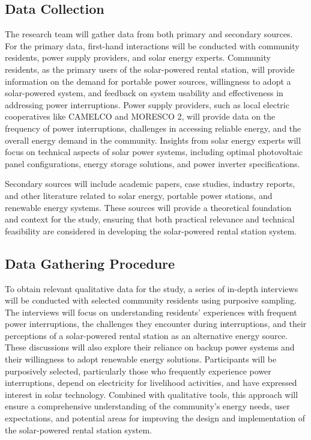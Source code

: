 {\subsection{Data Collection}

The research team will gather data from both primary and secondary sources. For the primary data, first-hand interactions will be conducted with community residents, power supply providers, and solar energy experts. Community residents, as the primary users of the solar-powered rental station, will provide information on the demand for portable power sources, willingness to adopt a solar-powered system, and feedback on system usability and effectiveness in addressing power interruptions. Power supply providers, such as local electric cooperatives like CAMELCO and MORESCO 2, will provide data on the frequency of power interruptions, challenges in accessing reliable energy, and the overall energy demand in the community. Insights from solar energy experts will focus on technical aspects of solar power systems, including optimal photovoltaic panel configurations, energy storage solutions, and power inverter specifications.

Secondary sources will include academic papers, case studies, industry reports, and other literature related to solar energy, portable power stations, and renewable energy systems. These sources will provide a theoretical foundation and context for the study, ensuring that both practical relevance and technical feasibility are considered in developing the solar-powered rental station system.

\subsection{Data Gathering Procedure}

To obtain relevant qualitative data for the study, a series of in-depth interviews will be conducted with selected community residents using purposive sampling. The interviews will focus on understanding residents’ experiences with frequent power interruptions, the challenges they encounter during interruptions, and their perceptions of a solar-powered rental station as an alternative energy source. These discussions will also explore their reliance on backup power systems and their willingness to adopt renewable energy solutions. Participants will be purposively selected, particularly those who frequently experience power interruptions, depend on electricity for livelihood activities, and have expressed interest in solar technology. Combined with qualitative tools, this approach will ensure a comprehensive understanding of the community’s energy needs, user expectations, and potential areas for improving the design and implementation of the solar-powered rental station system.

}
